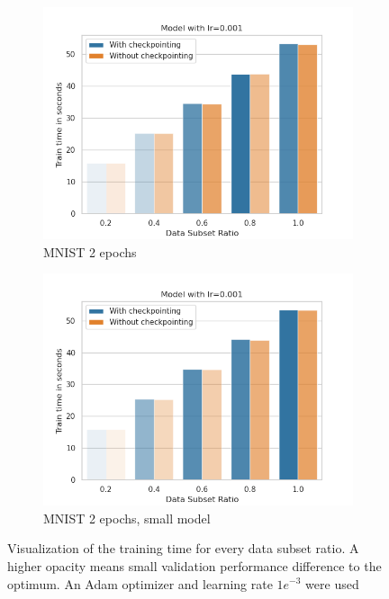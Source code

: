 \begin{figure}[h]
\begin{subfigure}[b]{0.24\textwidth}
        \centering
        \includegraphics[width=\textwidth]{figures/22_07/2ep/train_subset_0.001.png}
        \caption{MNIST 2 epochs}
        \label{fig:10c}
    \end{subfigure}
    \begin{subfigure}[b]{0.24\textwidth}
        \centering
        \includegraphics[width=\textwidth]{figures/22_07/2ep_smaller/train_subset_0.001.png}
        \caption{MNIST 2 epochs, small model}
        \label{fig:10d}
    \end{subfigure}
    \caption{Visualization of the training time for every data subset ratio. A higher opacity means small validation performance difference to the optimum. An Adam optimizer and learning rate $1e^{-3}$ were used}
    \label{fig:10}
\end{figure}

